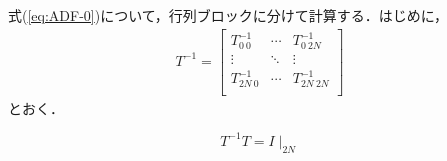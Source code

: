 \documentclass[11pt,a4paper,titlepage]{jsreport}
\theoremstyle{definition}
\begin{document}
式(\ref{eq:ADF-0})について，行列ブロックに分けて計算する．はじめに，
\begin{equation*}
  \begin{split}
    T^{-1}
    =\begin{bmatrix}
      T^{-1}_{0\ 0} & \cdots & T^{-1}_{0\ 2N} \\
      \vdots & \ddots & \vdots \\
      T^{-1}_{2N\ 0} & \cdots & T^{-1}_{2N\ 2N} \\
    \end{bmatrix}
  \end{split}
\end{equation*}
とおく．

\begin{equation}
  T^{-1}T = I \mid_{2N}
\end{equation}
\end{document}
